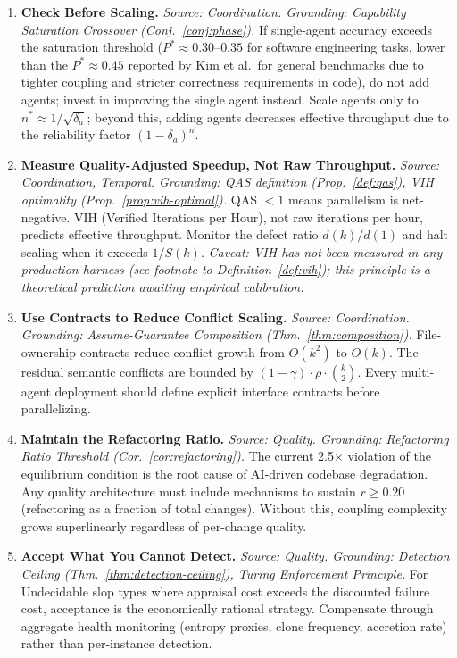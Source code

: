 \documentclass[11pt, a4paper, logo, copyright]{googledeepmind}
\begin{document}
\begin{enumerate}[label=\textbf{P\arabic*.}, leftmargin=3em, resume]
\item \textbf{Check Before Scaling.}
\emph{Source: Coordination. Grounding: Capability Saturation Crossover (Conj.~\ref{conj:phase}).}
If single-agent accuracy exceeds the saturation threshold ($P^* \approx 0.30$--$0.35$ for software engineering tasks, lower than the $P^* \approx 0.45$ reported by Kim et al.\ for general benchmarks due to tighter coupling and stricter correctness requirements in code), do not add agents; invest in improving the single agent instead. Scale agents only to $n^* \approx 1/\sqrt{\delta_a}$; beyond this, adding agents decreases effective throughput due to the reliability factor $(1-\delta_a)^n$.

\item \textbf{Measure Quality-Adjusted Speedup, Not Raw Throughput.}
\emph{Source: Coordination, Temporal. Grounding: QAS definition (Prop.~\ref{def:qas}), VIH optimality (Prop.~\ref{prop:vih-optimal}).}
QAS $< 1$ means parallelism is net-negative. VIH (Verified Iterations per Hour), not raw iterations per hour, predicts effective throughput. Monitor the defect ratio $d(k)/d(1)$ and halt scaling when it exceeds $1/S(k)$. \emph{Caveat: VIH has not been measured in any production harness (see footnote to Definition~\ref{def:vih}); this principle is a theoretical prediction awaiting empirical calibration.}

\item \textbf{Use Contracts to Reduce Conflict Scaling.}
\emph{Source: Coordination. Grounding: Assume-Guarantee Composition (Thm.~\ref{thm:composition}).}
File-ownership contracts reduce conflict growth from $O(k^2)$ to $O(k)$. The residual semantic conflicts are bounded by $(1-\gamma) \cdot \rho \cdot \binom{k}{2}$. Every multi-agent deployment should define explicit interface contracts before parallelizing.

\item \textbf{Maintain the Refactoring Ratio.}
\emph{Source: Quality. Grounding: Refactoring Ratio Threshold (Cor.~\ref{cor:refactoring}).}
The current 2.5$\times$ violation of the equilibrium condition is the root cause of AI-driven codebase degradation. Any quality architecture must include mechanisms to sustain $r \geq 0.20$ (refactoring as a fraction of total changes). Without this, coupling complexity grows superlinearly regardless of per-change quality.

\item \textbf{Accept What You Cannot Detect.}
\emph{Source: Quality. Grounding: Detection Ceiling (Thm.~\ref{thm:detection-ceiling}), Turing Enforcement Principle.}
For Undecidable slop types where appraisal cost exceeds the discounted failure cost, acceptance is the economically rational strategy. Compensate through aggregate health monitoring (entropy proxies, clone frequency, accretion rate) rather than per-instance detection.


\end{enumerate}
\end{document}
